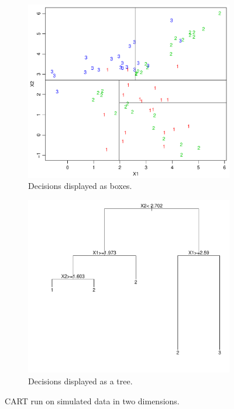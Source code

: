 \begin{figure}[h!]
  \centering
  \begin{subfigure}[b]{0.48\textwidth}
    \includegraphics[width=\textwidth]{./figures/cartAreas1.pdf}
    \caption{Decisions displayed as boxes.}
    \label{fig:cartAreas1}
  \end{subfigure}%
  \quad
  \begin{subfigure}[b]{0.48\textwidth}
    \includegraphics[width=\textwidth]{./figures/cartTree1.pdf}
    \caption{Decisions displayed as a tree.}
    \label{fig:cartTree1}
  \end{subfigure}
  \vspace{1\baselineskip}
  \caption{CART run on simulated data in two dimensions. }
  \label{fig:cart}
\end{figure}
